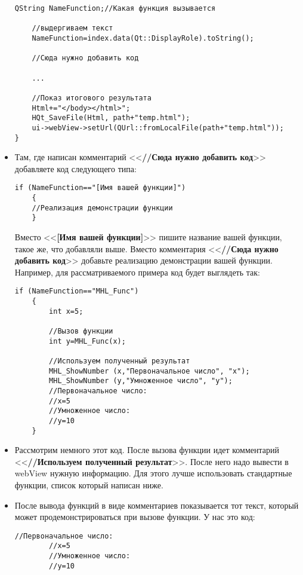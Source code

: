 \documentclass[a4paper,12pt]{article}
\begin{document}
\begin{itemize}
\begin{lstlisting}[label=examplefunction06, caption=MainWindow::on\_listView\_clicked]
    QString NameFunction;//Какая функция вызывается

    //выдергиваем текст
    NameFunction=index.data(Qt::DisplayRole).toString();

	//Сюда нужно добавить код 

	...

    //Показ итогового результата
    Html+="</body></html>";
    HQt_SaveFile(Html, path+"temp.html");
    ui->webView->setUrl(QUrl::fromLocalFile(path+"temp.html"));
}
\end{lstlisting}
\item Там, где написан комментарий <<\textbf{//Сюда нужно добавить код}>> добавляете код следующего типа:
\begin{lstlisting}[label=examplefunction07, caption=Добавление демонстрации работы функции]
    if (NameFunction=="[Имя вашей функции]")
    {
	//Реализация демонстрации функции
    }
\end{lstlisting}
Вместо <<\textbf{[Имя вашей функции]}>> пишите название вашей функции, такое же, что добавляли выше. Вместо комментария <<\textbf{//Сюда нужно добавить код}>> добавьте реализацию демонстрации вашей функции. Например, для рассматриваемого примера код будет выглядеть так:
\begin{lstlisting}[label=examplefunction08, caption=Добавление демонстрации работы функции на примере]
    if (NameFunction=="MHL_Func")
    {
        int x=5;

        //Вызов функции
        int y=MHL_Func(x);

        //Используем полученный результат
        MHL_ShowNumber (x,"Первоначальное число", "x");
        MHL_ShowNumber (y,"Умноженное число", "y");
        //Первоначальное число:
        //x=5
        //Умноженное число:
        //y=10
    }
\end{lstlisting}
\item Рассмотрим немного этот код. После вызова функции идет комментарий <<\textbf{//Используем полученный результат}>>. После него надо вывести в webView нужную информацию. Для этого лучше использовать стандартные функции, список который написан ниже.
\item  После вывода функций в виде комментариев показывается тот текст, который может продемонстрироваться при вызове функции. У нас это код:
\begin{lstlisting}[label=examplefunction09, caption=Закомментированный результат работы функции]
        //Первоначальное число:
        //x=5
        //Умноженное число:
        //y=10
\end{lstlisting}
\end{itemize}
\end{document}
